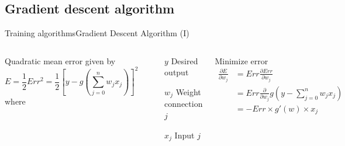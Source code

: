 \documentclass[10pt,compress]{beamer} %
\begin{document}
\subsection{Gradient descent algorithm}
\begin{frame}{Training algorithms}{Gradient Descent Algorithm (I)}
	\small{
	\begin{columns}
	Quadratic mean error given by
		\begin{equation*}
		E = \frac{1}{2} Err^2 = \frac{1}{2} \left[y-g\left(\sum_{j=0}^n w_j x_j\right)\right]^2
		\end{equation*}
		where
		\begin{flushleft}
		\begin{itemize}
		\item[$y$] Desired output
		\item[$w_j$] Weight connection $j$
		\item[$x_j$] Input $j$
		\end{itemize}
		\end{flushleft}
	Minimize error
		\begin{equation*}
		\begin{split}
		\frac{\partial E}{\partial w_j} &= Err \frac{\partial Err}{\partial w_j}\\
										&= Err \frac{\partial}{\partial w_j} g\left(y-\sum_{j=0}^n w_j x_j\right)\\
										&= -Err \times g'(w) \times x_j
		\end{split}
		\end{equation*}
	\end{columns}
	}
\end{frame}
\end{document}
